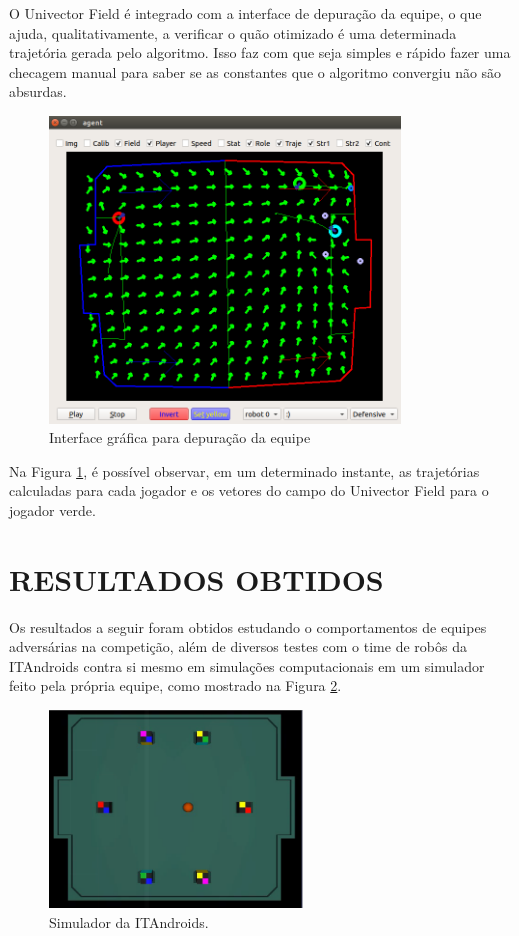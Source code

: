 \documentclass[10pt,fleqn,a4paper]{article}
\begin{document}
O Univector Field é integrado com a interface de depuração da equipe, o que ajuda, qualitativamente, a verificar o quão otimizado é uma determinada trajetória gerada pelo algoritmo. Isso faz com que seja simples e rápido fazer uma checagem manual para saber se as constantes que o algoritmo convergiu não são absurdas.

\begin{figure}[H]
	\centering
	\includegraphics[width=0.83\textwidth]{figures/UnivectorFieldSimulatorDebugger.png}
	\caption{Interface gráfica para depuração da equipe}
	\label{fig:univector}
\end{figure}

Na Figura \ref{fig:univector}, é possível observar, em um determinado instante, as trajetórias calculadas para cada jogador e os vetores do campo do Univector Field para o jogador verde.


    \section{RESULTADOS OBTIDOS}
        
	Os resultados a seguir foram obtidos estudando o comportamentos de equipes adversárias na competição, além de diversos testes com o time de robôs da ITAndroids contra si mesmo em simulações computacionais em um simulador feito pela própria equipe, como mostrado na Figura \ref{fig:simulator}.

\begin{figure}[H]
	\centering
	\includegraphics[width=0.6\textwidth]{figures/SimulatorWithoutButtons.png}
	\caption{Simulador da ITAndroids.}
	\label{fig:simulator}
\end{figure}
\end{document}
